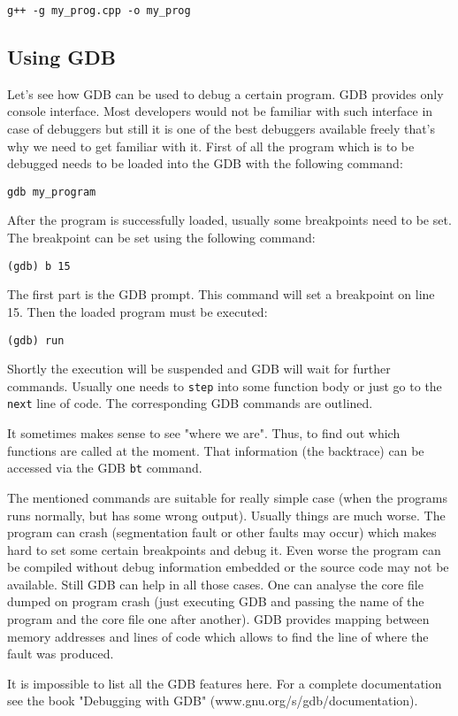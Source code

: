 {\tt g++ -g my\_prog.cpp -o my\_prog}

\subsection{Using GDB}
Let's see how GDB can be used to debug a certain program. GDB provides only console interface. Most developers would not be familiar with such interface in case of debuggers but still it is one of the best debuggers available freely that's why we need to get familiar with it. First of all the program which is to be debugged needs to be loaded into the GDB with the following command:

{\tt gdb my\_program }

After the program is successfully loaded, usually some breakpoints need to be set. The breakpoint can be set using the following command:

{\tt (gdb) b 15 }

The first part is the GDB prompt. This command will set a breakpoint on line 15. Then the loaded program must be executed:

{\tt (gdb) run }

Shortly the execution will be suspended and GDB will wait for further commands. Usually one needs to {\tt step} into some function body or just go to the {\tt next} line of code. The corresponding GDB commands are outlined.

It sometimes makes sense to see "where we are". Thus, to find out which functions are called at the moment. That information (the backtrace) can be accessed via the GDB {\tt bt} command.

The mentioned commands are suitable for really simple case (when the programs runs normally, but has some wrong output). Usually things are much worse. The program can crash (segmentation fault or other faults may occur) which makes hard to set some certain breakpoints and debug it. Even worse the program can be compiled without debug information embedded or the source code may not be available. Still GDB can help in all those cases. One can analyse the core file dumped on program crash (just executing GDB and passing the name of the program and the core file one after another). GDB provides mapping between memory addresses and lines of code which allows to find the line of where the fault was produced. 

It is impossible to list all the GDB features here. For a complete documentation see the book "Debugging with GDB" (www.gnu.org/s/gdb/documentation).

